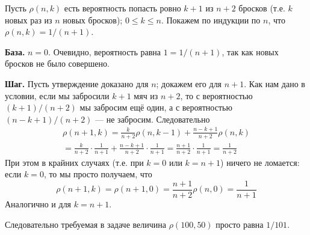 \documentclass[12pt,a4paper]{article}
\begin{document}
    \begin{enumproblem}
        Пусть $\rho(n, k)$ есть вероятность попасть ровно $k + 1$ из $n + 2$ бросков (т.е. $k$ новых раз из $n$ новых бросков); $0 \leqslant k \leqslant n$. Покажем по индукции по $n$, что $\rho(n, k) = 1/(n+1)$.

        \textbf{База.} $n = 0$. Очевидно, вероятность равна $1 = 1/(n+1)$, так как новых бросков не было совершено.

        \textbf{Шаг.} Пусть утверждение доказано для $n$; докажем его для $n+1$. Как нам дано в условии, если мы забросили $k+1$ мяч из $n+2$, то с вероятностью $(k+1)/(n+2)$ мы забросим ещё один, а с вероятностью $(n-k+1)/(n+2)$ --- не забросим. Следовательно
        \begin{multline*}
            \rho(n+1, k)
            = \frac{k}{n+2}\rho(n, k-1) + \frac{n-k+1}{n+2}\rho(n, k)\\
            = \frac{k}{n+2}\cdot\frac{1}{n+1} + \frac{n-k+1}{n+2}\cdot\frac{1}{n+1}
            = \frac{n+1}{n+2}\cdot\frac{1}{n+1}
            = \frac{1}{n+2}
        \end{multline*}
        При этом в крайних случаях (т.е. при $k = 0$ или $k = n+1$) ничего не ломается: если $k = 0$, то мы просто получаем, что
        \[\rho(n+1, k) = \rho(n+1, 0) = \frac{n+1}{n+2} \rho(n, 0) = \frac{1}{n+1}\]
        Аналогично и для $k = n+1$.

        Следовательно требуемая в задаче величина $\rho(100, 50)$ просто равна $1/101$.
    \end{enumproblem}
\end{document}
